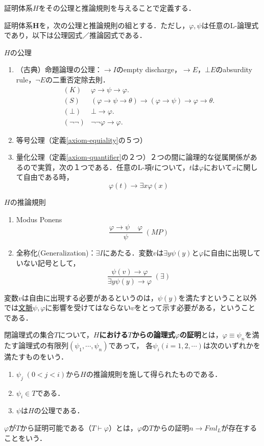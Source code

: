 \documentclass[uplatex, dvipdfmx]{jsreport}
\begin{document}
証明体系$H$をその公理と推論規則を与えることで定義する．
\begin{definition}
    証明体系$\mathbf{H}$を，次の公理と推論規則の組とする．ただし，$\varphi,\psi$は任意のL-論理式であり，以下は公理図式／推論図式である．

    $H$の公理
    \begin{enumerate}
        \item （古典）命題論理の公理：$\to I$のempty discharge，$\to E$，$\bot E$のabsurdity rule，$\lnot E$の二重否定除去則．
        \begin{align*}
            (K) &\varphi\to\psi\to\varphi.\\
            (S) &(\varphi\to\psi\to\theta)\to(\varphi\to\psi)\to\varphi\to\theta.\\
            (\bot) &\bot\to\varphi.\\
            (\lnot\lnot) &\lnot\lnot\varphi\to\varphi.
        \end{align*}
        \item 等号公理（定義\ref{axiom-equiality}の５つ）
        \item 量化公理（定義\ref{axiom-quantifier}の２つ）２つの間に論理的な従属関係があるので実質，次の１つである．任意のL-項$t$について，$t$は$\varphi$において$x$に関して自由である時，
        \[\varphi(t)\to\exists x\varphi(x)\]
    \end{enumerate}

    $H$の推論規則
    \begin{enumerate}
        \item Modus Ponens
        \[ \frac{\varphi\to\psi\;\;\;\;\varphi}{\psi}\;(MP) \]
        \item 全称化(Generalization)：$\exists I$にあたる．変数$v$は$\exists y\psi(y)$と$\varphi$に自由に出現していない記号として，
        \[\frac{\psi(v)\to\varphi}{\exists y\psi(y)\to\varphi}\;(\exists)\]
    \end{enumerate}
    変数$v$は自由に出現する必要があるというのは，$\psi(y)$を満たすということ以外では\underline{文脈}$\psi,\varphi$に影響を受けてはならない$v$をとって示す必要がある，ということである．
\end{definition}

\begin{definition}[H-proof]
    閉論理式の集合$T$について，\textbf{$H$における$T$からの論理式$\varphi$の証明}とは，$\varphi\equiv\psi_n$を満たす論理式の有限列$(\psi_1,\cdots,\psi_n)$であって，
    各$\psi_i(i=1,2,\cdots)$は次のいずれかを満たすものをいう．
    \begin{enumerate}
        \item $\psi_j\;(0<j<i)$から$H$の推論規則を施して得られたものである．
        \item $\psi_i\in T$である．
        \item $\psi$は$H$の公理である．
    \end{enumerate}
\end{definition}
\begin{definition}[provable]
    $\varphi$が$T$から証明可能である（$T\vdash\varphi$）とは，$\varphi$の$T$からの証明$n\to Fml_L$が存在することをいう．
\end{definition}
\end{document}
